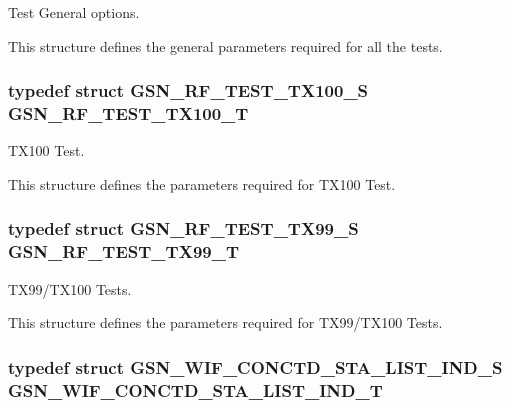 Test General options. 

This structure defines the general parameters required for all the tests. \hypertarget{a00677_ga69f7ed019cbe7d83cfe2cc5446cdab1a}{
\subsubsection[{GSN\_\-RF\_\-TEST\_\-TX100\_\-T}]{\setlength{\rightskip}{0pt plus 5cm}typedef struct {\bf GSN\_\-RF\_\-TEST\_\-TX100\_\-S} {\bf GSN\_\-RF\_\-TEST\_\-TX100\_\-T}}}
\label{a00677_ga69f7ed019cbe7d83cfe2cc5446cdab1a}


TX100 Test. 

This structure defines the parameters required for TX100 Test. \hypertarget{a00677_gad6f744cc56ee1d2eefa8b1b733cacbe5}{
\subsubsection[{GSN\_\-RF\_\-TEST\_\-TX99\_\-T}]{\setlength{\rightskip}{0pt plus 5cm}typedef struct {\bf GSN\_\-RF\_\-TEST\_\-TX99\_\-S} {\bf GSN\_\-RF\_\-TEST\_\-TX99\_\-T}}}
\label{a00677_gad6f744cc56ee1d2eefa8b1b733cacbe5}


TX99/TX100 Tests. 

This structure defines the parameters required for TX99/TX100 Tests. \hypertarget{a00677_ga7709929fb1c332b2853a998d3b305561}{
\subsubsection[{GSN\_\-WIF\_\-CONCTD\_\-STA\_\-LIST\_\-IND\_\-T}]{\setlength{\rightskip}{0pt plus 5cm}typedef struct {\bf GSN\_\-WIF\_\-CONCTD\_\-STA\_\-LIST\_\-IND\_\-S} {\bf GSN\_\-WIF\_\-CONCTD\_\-STA\_\-LIST\_\-IND\_\-T}}}
\label{a00677_ga7709929fb1c332b2853a998d3b305561}


